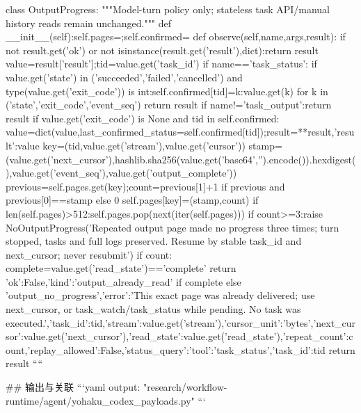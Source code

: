 class OutputProgress:
 """Model-turn policy only; stateless task API/manual history reads remain unchanged."""
 def __init__(self):self.pages={};self.confirmed={}
 def observe(self,name,args,result):
  if not result.get('ok') or not isinstance(result.get('result'),dict):return result
  value=result['result'];tid=value.get('task_id')
  if name=='task_status':
   if value.get('state') in ('succeeded','failed','cancelled') and type(value.get('exit_code')) is int:self.confirmed[tid]={k:value.get(k) for k in ('state','exit_code','event_seq')}
   return result
  if name!='task_output':return result
  if value.get('exit_code') is None and tid in self.confirmed:
   value=dict(value,last_confirmed_status=self.confirmed[tid]);result={**result,'result':value}
  key=(tid,value.get('stream'),value.get('cursor'))
  stamp=(value.get('next_cursor'),hashlib.sha256(value.get('base64','').encode()).hexdigest(),value.get('event_seq'),value.get('output_complete'))
  previous=self.pages.get(key);count=previous[1]+1 if previous and previous[0]==stamp else 0
  self.pages[key]=(stamp,count)
  if len(self.pages)>512:self.pages.pop(next(iter(self.pages)))
  if count>=3:raise NoOutputProgress('Repeated output page made no progress three times; turn stopped, tasks and full logs preserved. Resume by stable task_id and next_cursor; never resubmit')
  if count:
   complete=value.get('read_state')=='complete'
   return {'ok':False,'kind':'output_already_read' if complete else 'output_no_progress','error':'This exact page was already delivered; use next_cursor, or task_watch/task_status while pending. No task was executed.','task_id':tid,'stream':value.get('stream'),'cursor_unit':'bytes','next_cursor':value.get('next_cursor'),'read_state':value.get('read_state'),'repeat_count':count,'replay_allowed':False,'status_query':{'tool':'task_status','task_id':tid}}
  return result
````

## 输出与关联
```yaml
output: "research/workflow-runtime/agent/yohaku_codex_payloads.py"
```
